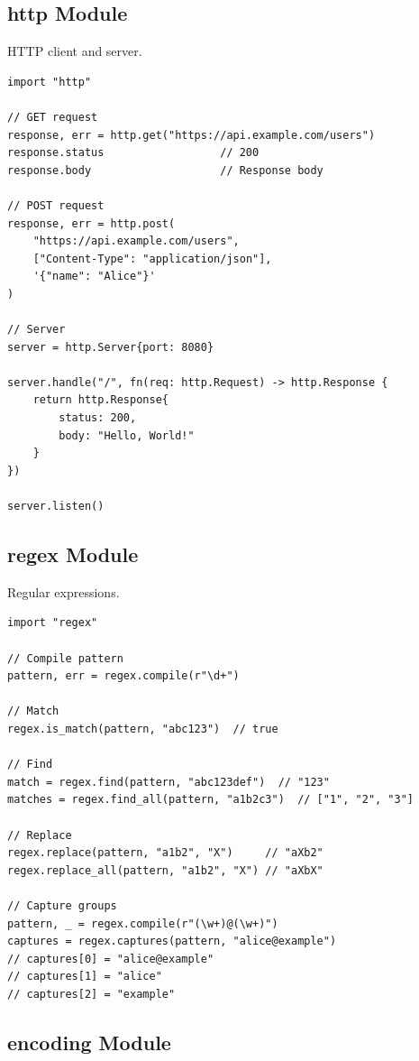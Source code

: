 \subsection{http Module}

HTTP client and server.

\begin{lstlisting}
import "http"

// GET request
response, err = http.get("https://api.example.com/users")
response.status                  // 200
response.body                    // Response body

// POST request
response, err = http.post(
    "https://api.example.com/users",
    ["Content-Type": "application/json"],
    '{"name": "Alice"}'
)

// Server
server = http.Server{port: 8080}

server.handle("/", fn(req: http.Request) -> http.Response {
    return http.Response{
        status: 200,
        body: "Hello, World!"
    }
})

server.listen()
\end{lstlisting}

\subsection{regex Module}

Regular expressions.

\begin{lstlisting}
import "regex"

// Compile pattern
pattern, err = regex.compile(r"\d+")

// Match
regex.is_match(pattern, "abc123")  // true

// Find
match = regex.find(pattern, "abc123def")  // "123"
matches = regex.find_all(pattern, "a1b2c3")  // ["1", "2", "3"]

// Replace
regex.replace(pattern, "a1b2", "X")     // "aXb2"
regex.replace_all(pattern, "a1b2", "X") // "aXbX"

// Capture groups
pattern, _ = regex.compile(r"(\w+)@(\w+)")
captures = regex.captures(pattern, "alice@example")
// captures[0] = "alice@example"
// captures[1] = "alice"
// captures[2] = "example"
\end{lstlisting}

\subsection{encoding Module}

